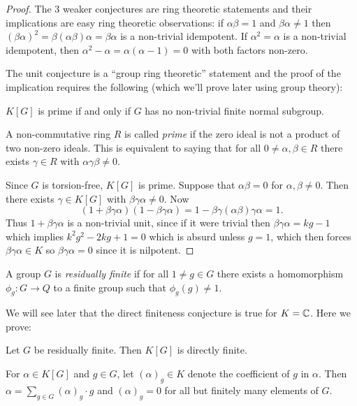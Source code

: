 \begin{proof}
    The 3 weaker conjectures are ring theoretic statements and their implications are easy ring theoretic observations: if $\alpha \beta = 1$ and $\beta \alpha \neq 1$ then $(\beta \alpha)^2 = \beta (\alpha \beta) \alpha = \beta \alpha$ is a non-trivial idempotent.
    If $\alpha^2 = \alpha$ is a non-trivial idempotent, then $\alpha^2 - \alpha = \alpha (\alpha - 1) = 0$ with both factors non-zero.

    The unit conjecture is a ``group ring theoretic'' statement and the proof of the implication requires the following (which we'll prove later using group theory):
    \begin{theorem}[Connell]
        $K[G]$ is prime if and only if $G$ has no non-trivial finite normal subgroup.
    \end{theorem}
    A non-commutative ring $R$ is called \emph{prime} if the zero ideal is not a product of two non-zero ideals.
    This is equivalent to saying that for all $0 \neq \alpha, \beta \in R$ there exists $\gamma \in R$ with $\alpha \gamma \beta \neq 0$.

    Since $G$ is torsion-free, $K[G]$ is prime.
    Suppose that $\alpha \beta = 0$ for $\alpha, \beta \neq 0$.
    Then there exists $\gamma \in K[G]$ with $\beta \gamma \alpha \neq 0$.
    Now \[
        (1 + \beta \gamma \alpha) (1 - \beta \gamma \alpha) = 1 - \beta \gamma (\alpha \beta) \gamma \alpha = 1.
    \]
    Thus $1 + \beta \gamma \alpha$ is a non-trivial unit, since if it were trivial then $\beta \gamma \alpha = kg - 1$ which implies $k^2 g^2 - 2kg + 1 = 0$ which is absurd unless $g = 1$, which then forces $\beta \gamma \alpha \in K$ so $\beta \gamma \alpha = 0$ since it is nilpotent.
\end{proof}

\begin{definition}
    A group $G$ is \emph{residually finite} if for all $1 \neq g \in G$ there exists a homomorphism $\phi_g \colon G \to Q$ to a finite group such that $\phi_g (g) \neq 1$.
\end{definition}

We will see later that the direct finiteness conjecture is true for $K = \mathbb{C}$.
Here we prove:

\begin{proposition}
    \label{proposition:rf_implies_df}
    Let $G$ be residually finite.
    Then $K[G]$ is directly finite.
\end{proposition}

\begin{notation}
For $\alpha \in K[G]$ and $g \in G$, let $(\alpha)_g \in K$ denote the coefficient of $g$ in $\alpha$.
Then $\alpha = \sum_{g \in G} (\alpha)_g \cdot g$ and $(\alpha)_g = 0$ for all but finitely many elements of $G$.
\end{notation}

